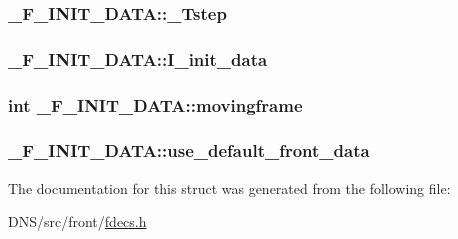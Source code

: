 \subsubsection[{\texorpdfstring{\+\_\+\+Tstep}{_Tstep}}]{ \+\_\+\+F\+\_\+\+I\+N\+I\+T\+\_\+\+D\+A\+T\+A\+::\+\_\+\+Tstep}\hypertarget{struct___f___i_n_i_t___d_a_t_a_af800d93cc6081dd6264eb9ff247d5878}{}\label{struct___f___i_n_i_t___d_a_t_a_af800d93cc6081dd6264eb9ff247d5878}
\subsubsection[{\texorpdfstring{I\+\_\+init\+\_\+data}{I_init_data}}]{ \+\_\+\+F\+\_\+\+I\+N\+I\+T\+\_\+\+D\+A\+T\+A\+::\+I\+\_\+init\+\_\+data}\hypertarget{struct___f___i_n_i_t___d_a_t_a_adfceb8fd3cc922dfeec9f20223d0bf77}{}\label{struct___f___i_n_i_t___d_a_t_a_adfceb8fd3cc922dfeec9f20223d0bf77}
\subsubsection[{\texorpdfstring{movingframe}{movingframe}}]{\setlength{\rightskip}{0pt plus 5cm}int \+\_\+\+F\+\_\+\+I\+N\+I\+T\+\_\+\+D\+A\+T\+A\+::movingframe}\hypertarget{struct___f___i_n_i_t___d_a_t_a_a0c0d36d387f633914c99a05ae00aec18}{}\label{struct___f___i_n_i_t___d_a_t_a_a0c0d36d387f633914c99a05ae00aec18}
\subsubsection[{\texorpdfstring{use\+\_\+default\+\_\+front\+\_\+data}{use_default_front_data}}]{ \+\_\+\+F\+\_\+\+I\+N\+I\+T\+\_\+\+D\+A\+T\+A\+::use\+\_\+default\+\_\+front\+\_\+data}\hypertarget{struct___f___i_n_i_t___d_a_t_a_adb6d275bbd4e0c485102a481e9c9664a}{}\label{struct___f___i_n_i_t___d_a_t_a_adb6d275bbd4e0c485102a481e9c9664a}


The documentation for this struct was generated from the following file\+:\begin{DoxyCompactItemize}
\item 
D\+N\+S/src/front/\hyperlink{fdecs_8h}{fdecs.\+h}\end{DoxyCompactItemize}

